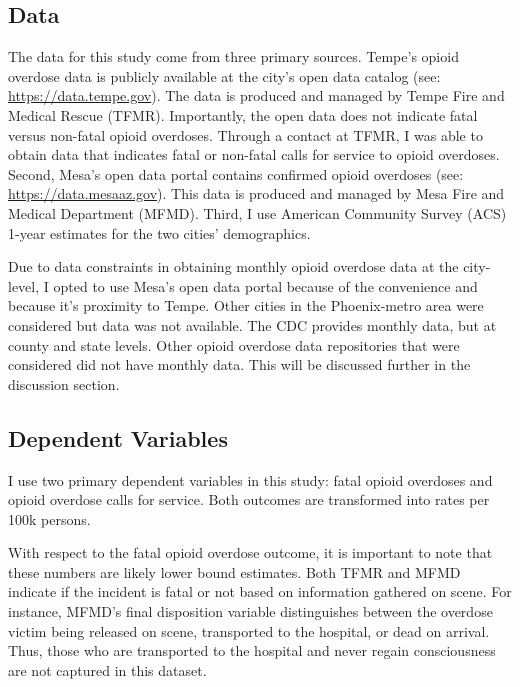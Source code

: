 \subsection{Data}
The data for this study come from three primary sources. Tempe's opioid overdose data is publicly available at the city's open data catalog (see: \href{https://data.tempe.gov/datasets/2daeeafd2741494c8294ca415e5a793e_0/explore?location=33.398962%2C-111.931850%2C11.93}{https://data.tempe.gov}). The data is produced and managed by Tempe Fire and Medical Rescue (TFMR). Importantly, the open data does not indicate fatal versus non-fatal opioid overdoses. Through a contact at TFMR, I was able to obtain data that indicates fatal or non-fatal calls for service to opioid overdoses. Second, Mesa's open data portal contains confirmed opioid overdoses (see: \href{https://data.mesaaz.gov/Fire-and-Medical/Fire-and-Medical-Opioid-Overdose-Incidents/qufy-tzv6/about_data}{https://data.mesaaz.gov}). This data is produced and managed by Mesa Fire and Medical Department (MFMD). Third, I use American Community Survey (ACS) 1-year estimates for the two cities' demographics.

Due to data constraints in obtaining monthly opioid overdose data at the city-level, I opted to use Mesa's open data portal because of the convenience and because it's proximity to Tempe. Other cities in the Phoenix-metro area were considered but data was not available. The CDC provides monthly data, but at county and state levels. Other opioid overdose data repositories that were considered did not have monthly data. This will be discussed further in the discussion section.

\subsection{Dependent Variables}
I use two primary dependent variables in this study: fatal opioid overdoses and opioid overdose calls for service. Both outcomes are transformed into rates per 100k persons.

With respect to the fatal opioid overdose outcome, it is important to note that these numbers are likely lower bound estimates. Both TFMR and MFMD indicate if the incident is fatal or not based on information gathered on scene. For instance, MFMD's final disposition variable distinguishes between the overdose victim being released on scene, transported to the hospital, or dead on arrival. Thus, those who are transported to the hospital and never regain consciousness are not captured in this dataset.

